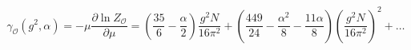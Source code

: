 \begin{equation}
\gamma _{\mathcal{O}}(g^{2},\alpha)=-\mu \frac{\partial \ln Z_{\mathcal{O}}
}{\partial {\mu }}=\left( \frac{35}{6}-\frac{\alpha }{2}\right) \frac{g^{2}N%
}{16\pi ^{2}}+\left(\frac{449}{24}-\frac{\alpha^{2}}{8}-\frac{11\alpha}{8}%
\right)\left(\frac{g^{2}N}{16\pi ^{2}}\right)^{2}+\ldots  \label{go}
\end{equation}

